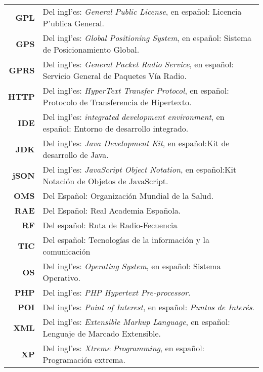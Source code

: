 \begin{center}
\begin{longtable}{r p{13.5cm}}
\textbf{GPL} & Del ingl'es: \textit{General Public License}, en espa\~nol: Licencia P'ublica General. \\

\textbf{GPS} & Del ingl'es: \textit{Global Positioning System}, en espa\~nol: Sistema de Posicionamiento Global. \\

\textbf{GPRS} & Del ingl'es: \textit{General Packet Radio Service}, en espa\~nol: Servicio General de Paquetes V\'ia Radio. \\

\textbf{HTTP} & Del ingl'es: \textit{HyperText Transfer Protocol}, en espa\~nol: Protocolo de Transferencia de Hipertexto. \\

\textbf{IDE} & Del ingl'es:  \textit{integrated development environment}, en espa\~nol: Entorno de desarrollo integrado. \\

\textbf{JDK}  & Del ingl'es: \textit{Java Development Kit}, en espa\~nol:Kit de desarrollo de Java.\\

\textbf{jSON}  & Del ingl'es: \textit{JavaScript Object Notation}, en espa\~nol:Kit Notaci\'on de Objetos de JavaScript.\\

\textbf{OMS} & Del Espa\~nol:  Organizaci\'on Mundial de la Salud.\\

\textbf{RAE} & Del Espa\~nol: Real Academia Espa\~nola. \\

\textbf{RF} & Del espa\~nol: Ruta de Radio-Fecuencia\\

\textbf{TIC} & Del espa\~nol: Tecnolog\'ias de la informaci\'on y la comunicaci\'on\\

\textbf{OS} & Del ingl'es: \textit{Operating System}, en espa\~nol: Sistema Operativo. \\

\textbf{PHP} & Del ingl'es: \textit{PHP Hypertext Pre-processor}.\\

\textbf{POI} & Del ingl'es: \textit{Point of Interest}, en espa\~nol: \textit{Puntos de Inter\'es}.\\

\textbf{XML} & Del ingl'es: \textit{Extensible Markup Language}, en espa\~nol: Lenguaje de Marcado Extensible. \\

\textbf{XP} & Del ingl'es: \textit{Xtreme Programming}, en espa\~nol: Programaci\'on extrema. \\

\end{longtable}\end{center}
